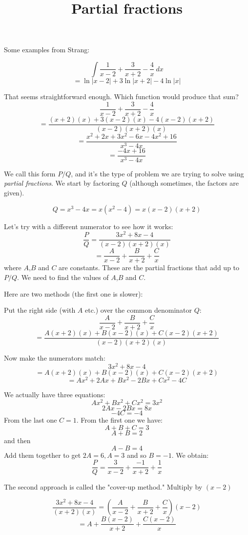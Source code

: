 \documentclass[11pt, oneside]{article}   	%
\title{Partial fractions}
\date{}							%
\begin{document}
\maketitle

\large
\noindent 

Some examples from Strang:

\[ \int \frac{1}{x-2} + \frac{3}{x+2} - \frac{4}{x} \ dx \]
\[ = \ln |x-2| + 3 \ln |x+2| - 4 \ln |x| \]

That seems straightforward enough.  Which function would produce that sum?
\[ \frac{1}{x-2} + \frac{3}{x+2} - \frac{4}{x}  \]
\[ =\frac{(x+2)(x) + 3(x-2)(x) -4(x-2)(x+2)}{(x-2)(x+2)(x)}  \]
\[ =\frac{x^2 + 2x + 3x^2 - 6x - 4x^2 + 16}{x^3 - 4x}  \]
\[ =\frac{- 4x + 16}{x^3 - 4x}  \]

We call this form $P/Q$, and it's the type of problem we are trying to solve using \emph{partial fractions}.  We start by factoring $Q$ (although sometimes, the factors are given).

\[ Q = x^3 - 4x = x(x^2 -4) = x (x-2) (x+2) \]

Let's try with a different numerator to see how it works:
\[ \frac{P}{Q} = \frac{3x^2 + 8x -4}{(x-2)(x+2)(x)}  \]
\[ = \frac{A}{x-2} + \frac{B}{x+2} + \frac{C}{x} \]
where $A$,$B$ and $C$ are constants.  These are the partial fractions that add up to $P/Q$.  We need to find the values of $A$,$B$ and $C$.

Here are two methods (the first one is slower):

Put the right side (with $A$ etc.) over the common denominator $Q$:
\[ \frac{A}{x-2} + \frac{B}{x+2} + \frac{C}{x} \]
\[ = \frac{A(x+2)(x) + B(x-2)(x) + C(x-2)(x+2)}{(x-2)(x+2)(x)} \]

Now make the numerators match:
\[ 3x^2 + 8x -4 \]
\[ = A(x+2)(x) + B(x-2)(x) + C(x-2)(x+2) \]
\[ = Ax^2 + 2Ax + Bx^2 - 2Bx + Cx^2 - 4C \]

We actually have three equations:
\[ Ax^2 + Bx^2 + Cx^2 = 3x^2 \]
\[ 2Ax - 2Bx = 8x \]
\[ -4C = -4 \]
From the last one $C=1$.  From the first one we have:
\[ A + B + C = 3 \]
\[ A + B = 2 \]
and then
\[ A - B = 4 \]
Add them together to get $2A = 6, A = 3$ and so $B = -1$.
We obtain:
\[ \frac{P}{Q} = \frac{3}{x-2} + \frac{-1}{x+2} + \frac{1}{x} \]

The second approach is called the "cover-up method."  Multiply by $(x-2)$

\[ \frac{3x^2 + 8x - 4}{(x+2)(x)} = (\frac{A}{x-2} + \frac{B}{x+2} + \frac{C}{x}) (x-2) \]
\[ = A +  \frac{B(x-2)}{x+2} + \frac{C(x-2)}{x} \]
\end{document}
